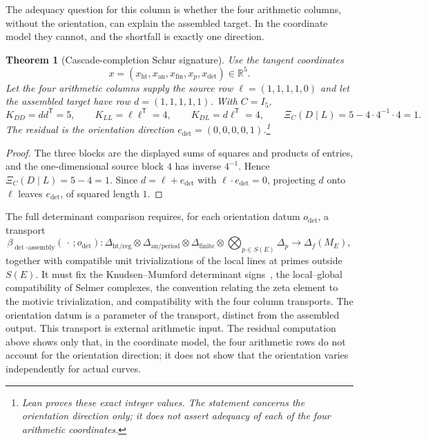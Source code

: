 \documentclass[11pt]{article}
\newtheorem{theorem}{Theorem}[section]
\theoremstyle{definition}
\newcommand{\R}{\mathbb{R}}
\newcommand{\XiC}{\Xi_C(D\mid L)}        \newcommand{\KDD}{K_{DD}}
\newcommand{\KDL}{K_{DL}}
\newcommand{\KLL}{K_{LL}}
\begin{document}
The adequacy question for this column is whether the four arithmetic
columns, without the orientation, can explain the assembled target.  In
the coordinate model they cannot, and the shortfall is exactly one
direction.

\begin{theorem}[Cascade-completion Schur signature]\label{thm:apparatus:cascade-completion-signature}
Use the tangent coordinates
\[
  x=(x_{\mathrm{ht}},x_{\mathrm{an}},x_{\mathrm{fin}},x_p,x_{\det})\in\R^5 .
\]
Let the four arithmetic columns supply the source row
$\ell=(1,1,1,1,0)$ and let the assembled target have row
$d=(1,1,1,1,1)$.  With $C=I_5$,
\[
  \KDD=dd^{\mathsf T}=5,\qquad
  \KLL=\ell\ell^{\mathsf T}=4,\qquad
  \KDL=d\ell^{\mathsf T}=4,
  \qquad
  \XiC=5-4\cdot4^{-1}\cdot4=1.
\]
The residual is the orientation direction $e_{\det}=(0,0,0,0,1)$.\footnote{Lean proves these exact integer values.  The statement concerns
the orientation direction only; it does not assert adequacy of each of the
four arithmetic coordinates.}
\end{theorem}

\begin{proof}
The three blocks are the displayed sums of squares and products of
entries, and the one-dimensional source block $4$ has inverse $4^{-1}$.
Hence $\XiC=5-4=1$.  Since $d=\ell+e_{\det}$ with $\ell\cdot e_{\det}=0$,
projecting $d$ onto $\ell$ leaves $e_{\det}$, of squared length $1$.
\end{proof}

\begin{obligation}\label{obl:apparatus:rho-det-assembly}
The full determinant comparison requires, for each orientation datum
$o_{\det}$, a transport
\[
  \beta_{\det\text{-}\mathrm{assembly}}(\,\cdot\,;o_{\det}):
  \Delta_{\mathrm{ht/reg}}
  \otimes
  \Delta_{\mathrm{an/period}}
  \otimes
  \Delta_{\mathrm{finite}}
  \otimes
  \bigotimes_{p\in S(E)}\Delta_p
  \longrightarrow
  \Delta_f(M_E),
\]
together with compatible unit trivializations of the local lines at primes
outside $S(E)$.  It must fix the Knudsen--Mumford determinant
signs~\citep{KnudsenMumford1976}, the local--global compatibility of
Selmer complexes, the convention relating the zeta element to the
motivic trivialization, and compatibility with the four column
transports.  The orientation datum is a parameter of the transport,
distinct from the assembled output.  This transport is external
arithmetic input.  The residual computation above shows only that, in the
coordinate model, the four arithmetic rows do not account for the
orientation direction; it does not show that the orientation varies
independently for actual curves.
\end{obligation}
\end{document}
